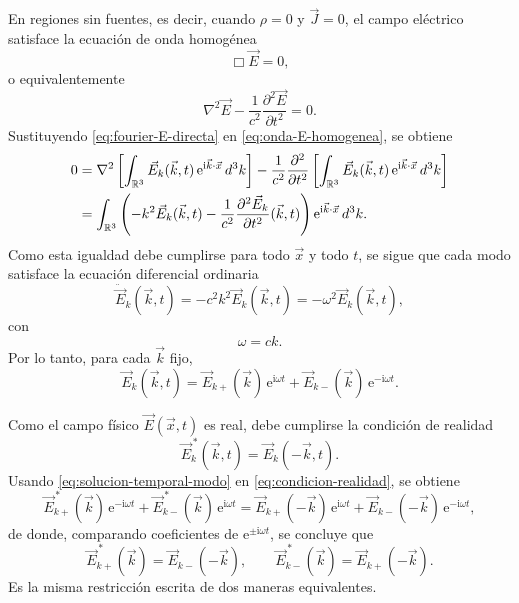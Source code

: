 \documentclass[12pt,a4paper]{article}
\theoremstyle{definition}
\theoremstyle{plain}
\numberwithin{equation}{section}
\theoremstyle{remark}
\newcommand{\ii}{\mathrm{i}}
\newcommand{\ee}{\mathrm{e}}
\begin{document}
En regiones sin fuentes, es decir, cuando $\rho=0$ y $\vec J=0$, el campo eléctrico satisface la ecuación de onda homogénea
\begin{equation*}
    \Box\vec E=0,
\end{equation*}
o equivalentemente
\begin{equation}
    \nabla^2\vec E-\frac{1}{c^2}\frac{\partial^2\vec E}{\partial t^2}=0.
    \label{eq:onda-E-homogenea}
\end{equation}
Sustituyendo \eqref{eq:fourier-E-directa} en \eqref{eq:onda-E-homogenea}, se obtiene
\begin{align*}
    0&=\nabla^2\left[\int_{\mathbb R^3}\vec E_k(\vec k,t)\,\ee^{\ii\vec k\cdot\vec x}\,d^3k\right]
    -\frac{1}{c^2}\frac{\partial^2}{\partial t^2}\left[\int_{\mathbb R^3}\vec E_k(\vec k,t)\,\ee^{\ii\vec k\cdot\vec x}\,d^3k\right] 
\notag\\
    &=\int_{\mathbb R^3}\left(-k^2\vec E_k(\vec k,t)-\frac{1}{c^2}\frac{\partial^2\vec E_k}{\partial t^2}(\vec k,t)\right)\ee^{\ii\vec k\cdot\vec x}\,d^3k.
\end{align*}
Como esta igualdad debe cumplirse para todo $\vec x$ y todo $t$, se sigue que cada modo satisface la ecuación diferencial ordinaria
\begin{equation*}
    \ddot{\vec E}_k(\vec k,t)=-c^2k^2\vec E_k(\vec k,t)=-\omega^2\vec E_k(\vec k,t),
\end{equation*}
con
\begin{equation*}
    \omega=ck.
\end{equation*}
Por lo tanto, para cada $\vec k$ fijo,
\begin{equation}
    \vec E_k(\vec k,t)=\vec E_{k+}(\vec k)\,\ee^{\ii\omega t}+\vec E_{k-}(\vec k)\,\ee^{-\ii\omega t}.
    \label{eq:solucion-temporal-modo}
\end{equation}

Como el campo físico $\vec E(\vec x,t)$ es real, debe cumplirse la condición de realidad
\begin{equation}
    \vec E_k^{\,*}(\vec k,t)=\vec E_k(-\vec k,t).
    \label{eq:condicion-realidad}
\end{equation}
Usando \eqref{eq:solucion-temporal-modo} en \eqref{eq:condicion-realidad}, se obtiene
\begin{equation*}
    \vec E_{k+}^{\,*}(\vec k)\,\ee^{-\ii\omega t}+\vec E_{k-}^{\,*}(\vec k)\,\ee^{\ii\omega t}
    =
    \vec E_{k+}(-\vec k)\,\ee^{\ii\omega t}+\vec E_{k-}(-\vec k)\,\ee^{-\ii\omega t},
\end{equation*}
de donde, comparando coeficientes de $\ee^{\pm\ii\omega t}$, se concluye que
\begin{equation*}
    \vec E_{k+}^{\,*}(\vec k)=\vec E_{k-}(-\vec k),
    \qquad
    \vec E_{k-}^{\,*}(\vec k)=\vec E_{k+}(-\vec k).
\end{equation*}
Es la misma restricción escrita de dos maneras equivalentes.
\end{document}
